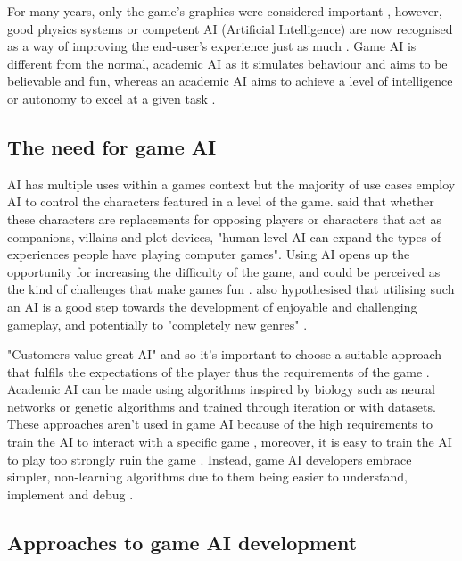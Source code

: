 \documentclass[11pt, a4paper]{report}
\begin{document}
For many years, only the game's graphics were considered important \parencites{yap2002grid, blow2004game}, however, good physics systems or competent AI (Artificial Intelligence) are now recognised as a way of improving the end-user's experience just as much \parencite{blow2004game}. Game AI is different from the normal, academic AI as it simulates behaviour and aims to be believable and fun, whereas an academic AI aims to achieve a level of intelligence or autonomy to excel at a given task \parencite[60]{nareyek2004ai}.

\subsection{The need for game AI}
\label{subsec:theNeedForGameAI}

AI has multiple uses within a games context but the majority of use cases employ AI to control the characters featured in a level of the game. \citeauthor{laird2001human} \parencite*[16]{laird2001human} said that whether these characters are replacements for opposing players or characters that act as companions, villains and plot devices, "human-level AI can expand the types of experiences people have playing computer games". Using AI opens up the opportunity for increasing the difficulty of the game, and could be perceived as the kind of challenges that make games fun \parencite[2]{buro2004call}. \citeauthor{laird2001human} \parencite*[16]{laird2001human} also hypothesised that utilising such an AI is a good step towards the development of enjoyable and challenging gameplay, and potentially to "completely new genres" \parencite[17]{laird2001human}.

 "Customers value great AI" \parencite[60]{nareyek2004ai} and so it's important to choose a suitable approach that fulfils the expectations of the player thus the requirements of the game \parencite[19]{millington2019ai}. Academic AI can be made using algorithms inspired by biology such as neural networks or genetic algorithms and trained through iteration or with datasets. These approaches aren't used in game AI because of the high requirements to train the AI to interact with a specific game \parencite[64]{nareyek2004ai}, moreover, it is easy to train the AI to play too strongly ruin the game \parencite[13]{tozour2002evolution}. Instead, game AI developers embrace simpler, non-learning algorithms due to them being easier to understand, implement and debug \parencite[7]{tozour2002evolution}.

\subsection{Approaches to game AI development}
\label{subsec:approachesToGameAIDevelopment}
\end{document}
